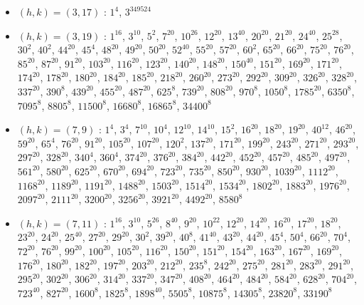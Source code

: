 \begin{itemize}
\item $(h,k)=(3,17)$ : $1^{4}$, $3^{349524}$
\item $(h,k)=(3,19)$ : $1^{16}$, $3^{10}$, $5^{2}$, $7^{20}$, $10^{26}$, $12^{20}$, $13^{40}$, $20^{20}$, $21^{20}$, $24^{40}$, $25^{28}$, $30^{2}$, $40^{2}$, $44^{20}$, $45^{4}$, $48^{20}$, $49^{20}$, $50^{20}$, $52^{40}$, $55^{20}$, $57^{20}$, $60^{2}$, $65^{20}$, $66^{20}$, $75^{20}$, $76^{20}$, $85^{20}$, $87^{20}$, $91^{20}$, $103^{20}$, $116^{20}$, $123^{20}$, $140^{20}$, $148^{20}$, $150^{40}$, $151^{20}$, $169^{20}$, $171^{20}$, $174^{20}$, $178^{20}$, $180^{20}$, $184^{20}$, $185^{20}$, $218^{20}$, $260^{20}$, $273^{20}$, $292^{20}$, $309^{20}$, $326^{20}$, $328^{20}$, $337^{20}$, $390^{8}$, $439^{20}$, $455^{20}$, $487^{20}$, $625^{8}$, $739^{20}$, $808^{20}$, $970^{8}$, $1050^{8}$, $1785^{20}$, $6350^{8}$, $7095^{8}$, $8805^{8}$, $11500^{8}$, $16680^{8}$, $16865^{8}$, $34400^{8}$
\item $(h,k)=(7,9)$ : $1^{4}$, $3^{4}$, $7^{10}$, $10^{4}$, $12^{10}$, $14^{10}$, $15^{2}$, $16^{20}$, $18^{20}$, $19^{20}$, $40^{12}$, $46^{20}$, $59^{20}$, $65^{4}$, $76^{20}$, $91^{20}$, $105^{20}$, $107^{20}$, $120^{2}$, $137^{20}$, $171^{20}$, $199^{20}$, $243^{20}$, $271^{20}$, $293^{20}$, $297^{20}$, $328^{20}$, $340^{4}$, $360^{4}$, $374^{20}$, $376^{20}$, $384^{20}$, $442^{20}$, $452^{20}$, $457^{20}$, $485^{20}$, $497^{20}$, $561^{20}$, $580^{20}$, $625^{20}$, $670^{20}$, $694^{20}$, $723^{20}$, $735^{20}$, $850^{20}$, $930^{20}$, $1039^{20}$, $1112^{20}$, $1168^{20}$, $1189^{20}$, $1191^{20}$, $1488^{20}$, $1503^{20}$, $1514^{20}$, $1534^{20}$, $1802^{20}$, $1883^{20}$, $1976^{20}$, $2097^{20}$, $2111^{20}$, $3200^{20}$, $3256^{20}$, $3921^{20}$, $4492^{20}$, $8580^{8}$
\item $(h,k)=(7,11)$ : $1^{16}$, $3^{10}$, $5^{26}$, $8^{40}$, $9^{20}$, $10^{22}$, $12^{20}$, $14^{20}$, $16^{20}$, $17^{20}$, $18^{20}$, $23^{20}$, $24^{20}$, $25^{40}$, $27^{20}$, $29^{20}$, $30^{2}$, $39^{20}$, $40^{8}$, $41^{40}$, $43^{20}$, $44^{20}$, $45^{4}$, $50^{4}$, $66^{20}$, $70^{4}$, $72^{20}$, $76^{20}$, $99^{20}$, $100^{20}$, $105^{20}$, $116^{20}$, $150^{20}$, $151^{20}$, $154^{20}$, $163^{20}$, $167^{20}$, $169^{20}$, $176^{20}$, $180^{20}$, $182^{20}$, $197^{20}$, $203^{20}$, $212^{20}$, $235^{8}$, $242^{20}$, $275^{20}$, $281^{20}$, $283^{20}$, $291^{20}$, $295^{20}$, $302^{20}$, $306^{20}$, $314^{20}$, $337^{20}$, $347^{20}$, $408^{20}$, $464^{20}$, $484^{20}$, $584^{20}$, $628^{20}$, $704^{20}$, $723^{40}$, $827^{20}$, $1600^{8}$, $1825^{8}$, $1898^{40}$, $5505^{8}$, $10875^{8}$, $14305^{8}$, $23820^{8}$, $33190^{8}$

\end{itemize}
